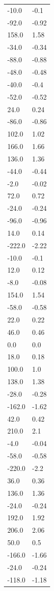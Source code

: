 \begin{longtable}{ll}
-10.0 & -0.1 \\
-92.0 & -0.92 \\
158.0 & 1.58 \\
-34.0 & -0.34 \\
-88.0 & -0.88 \\
-48.0 & -0.48 \\
-40.0 & -0.4 \\
-52.0 & -0.52 \\
24.0 & 0.24 \\
-86.0 & -0.86 \\
102.0 & 1.02 \\
166.0 & 1.66 \\
136.0 & 1.36 \\
-44.0 & -0.44 \\
-2.0 & -0.02 \\
72.0 & 0.72 \\
-24.0 & -0.24 \\
-96.0 & -0.96 \\
14.0 & 0.14 \\
-222.0 & -2.22 \\
-10.0 & -0.1 \\
12.0 & 0.12 \\
-8.0 & -0.08 \\
154.0 & 1.54 \\
-58.0 & -0.58 \\
22.0 & 0.22 \\
46.0 & 0.46 \\
0.0 & 0.0 \\
18.0 & 0.18 \\
100.0 & 1.0 \\
138.0 & 1.38 \\
-28.0 & -0.28 \\
-162.0 & -1.62 \\
42.0 & 0.42 \\
210.0 & 2.1 \\
-4.0 & -0.04 \\
-58.0 & -0.58 \\
-220.0 & -2.2 \\
36.0 & 0.36 \\
136.0 & 1.36 \\
-24.0 & -0.24 \\
192.0 & 1.92 \\
206.0 & 2.06 \\
50.0 & 0.5 \\
-166.0 & -1.66 \\
-24.0 & -0.24 \\
-118.0 & -1.18 \\

\end{longtable}
